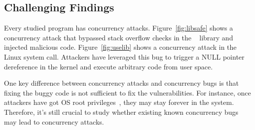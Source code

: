 \subsection{Challenging Findings}\label{sec:findings}







 Every 
studied program has concurrency attacks. Figure~\ref{fig:libsafe} shows a 
concurrency attack that bypassed stack overflow checks in the 
\libsafe~\cite{libsafe} library and injected malicious 
code. Figure~\ref{fig:uselib} shows a concurrency attack in the Linux \uselib 
system call. Attackers have leveraged this bug to trigger a NULL pointer 
dereference in the kernel and execute arbitrary code from user space.

One key difference between concurrency attacks and concurrency 
bugs is that fixing the buggy code is not sufficient to fix the 
vulnerabilities. For instance, once attackers have got OS root 
privileges~\cite{freebsd-exploit-2009-3527,uselib-bug-12791}, they may stay 
forever in the system. Therefore, it's still crucial to study whether existing 
known concurrency bugs may lead to concurrency attacks.

